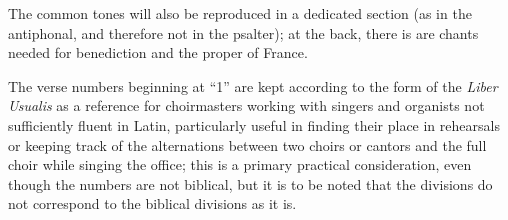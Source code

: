 \begin{enpars}
The common tones will also be reproduced in a dedicated section (as in the antiphonal, and therefore not in the psalter); at the back, there is are chants needed for benediction and the proper of France.

The verse numbers beginning at ``1'' are kept according to the form of the \textit{Liber Usualis} as a reference for choirmasters working with singers and organists not sufficiently fluent in Latin, particularly useful in finding their place in rehearsals or keeping track of the alternations between two choirs or cantors and the full choir while singing the office; this is a primary practical consideration, even though the numbers are not biblical, but it is to be noted that the divisions do not correspond to the biblical divisions as it is.
\end{enpars}
